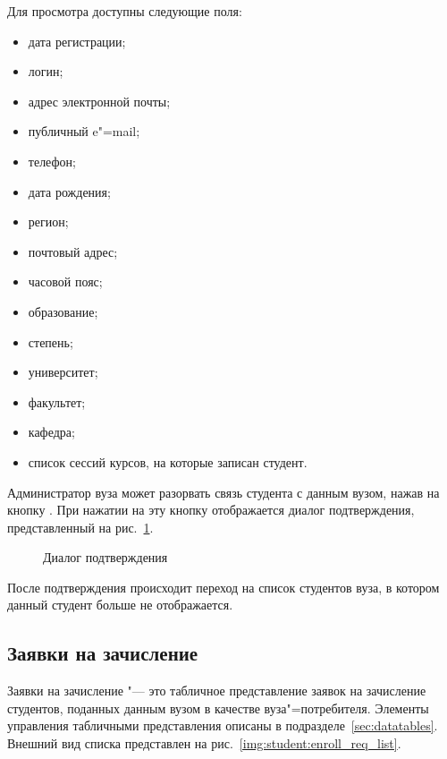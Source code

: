 Для просмотра доступны следующие поля:
\begin{itemize}
	\item дата регистрации;
	\item логин;
	\item адрес электронной почты;
	\item публичный e"=mail;
	\item телефон;
	\item дата рождения;
	\item регион;
	\item почтовый адрес;
	\item часовой пояс;
	\item образование;
	\item степень;
	\item университет;
	\item факультет;
	\item кафедра;
	\item список сессий курсов, на которые записан студент.
\end{itemize}

Администратор вуза может разорвать связь студента с данным вузом, нажав на кнопку . 
При нажатии на эту кнопку отображается диалог подтверждения, представленный на рис.~\ref{img:student:unbind_dialog}.

\begin{figure}[H]
	\caption{Диалог подтверждения}
	\label{img:student:unbind_dialog}
\end{figure}
После подтверждения происходит переход на список студентов вуза, в котором данный студент больше не отображается.


\subsection{Заявки на зачисление}

Заявки на зачисление "--- это табличное представление заявок на зачисление студентов, 
поданных данным вузом в качестве вуза"=потребителя. 
Элементы управления табличными представления описаны в подразделе~\ref{sec:datatables}.
Внешний вид списка представлен на рис.~\ref{img:student:enroll_req_list}. 

